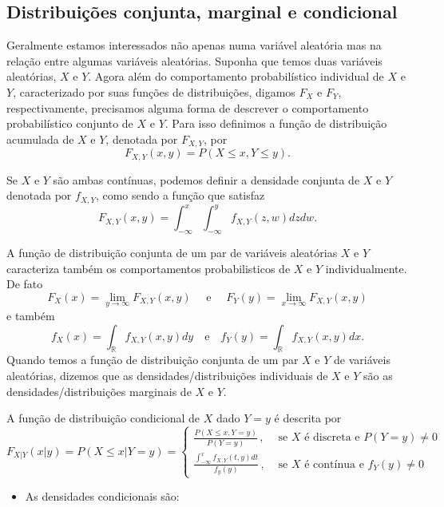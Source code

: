 \documentclass[
]{book}
\providecommand{\tightlist}{%
  \setlength{\itemsep}{0pt}\setlength{\parskip}{0pt}}
\theoremstyle{definition}
\theoremstyle{definition}
\theoremstyle{definition}
\theoremstyle{remark}
\begin{document}
\hypertarget{distribuiuxe7uxf5es-conjunta-marginal-e-condicional}{%
\subsection{Distribuições conjunta, marginal e condicional}\label{distribuiuxe7uxf5es-conjunta-marginal-e-condicional}}

Geralmente estamos interessados não apenas numa variável aleatória mas na relação entre algumas variáveis aleatórias. Suponha que temos duas variáveis aleatórias, \(X\) e \(Y\). Agora além do comportamento probabilístico individual de \(X\) e \(Y\), caracterizado por suas funções de distribuições, digamos \(F_X\) e \(F_Y\), respectivamente, precisamos alguma forma de descrever o comportamento probabilístico conjunto de \(X\) e \(Y\). Para isso definimos a função de distribuição acumulada de \(X\) e \(Y\), denotada por \(F_{X,Y}\), por \[F_{X,Y}(x,y)=P(X\leq x, Y\leq y).\]

Se \(X\) e \(Y\) são ambas contínuas, podemos definir a densidade conjunta de \(X\) e \(Y\) denotada por \(f_{X,Y}\), como sendo a função que satisfaz
\[F_{X,Y}(x,y)=\int_{-\infty}^x \int_{-\infty}^y f_{X,Y}(z,w)dzdw.\]

A função de distribuição conjunta de um par de variáveis aleatórias \(X\) e \(Y\) caracteriza também os comportamentos probabilisticos de \(X\) e \(Y\) individualmente. De fato
\[F_X(x)=\lim_{y\rightarrow\infty}F_{X,Y}(x,y) \quad \mbox{ e }\quad F_Y(y)=\lim_{x\rightarrow\infty}F_{X,Y}(x,y)\]
e também
\begin{equation*}
f_X(x)=\int_{\mathbb{R}}f_{X,Y}(x,y)dy\quad\mbox{e}\quad f_Y(y)=\int_{\mathbb{R}}f_{X,Y}(x,y)dx.
\end{equation*}
Quando temos a função de distribuição conjunta de um par \(X\) e \(Y\) de variáveis aleatórias, dizemos que as densidades/distribuições individuais de \(X\) e \(Y\) são as densidades/distribuições marginais de \(X\) e \(Y\).

A função de distribuição condicional de \(X\) dado \(Y=y\) é descrita por
\[F_{X|Y}(x|y)=P(X\leq x|Y=y)
=\left\{\begin{array}{cc} \frac{P(X\leq x,Y=y)}{P(Y=y)}\,, & \mbox{ se $X$ é discreta e }P(Y=y)\neq 0 \,\,\, \\
\frac{\int_{-\infty}^x f_{X,Y}(t,y)dt}{f_y(y)}\,, & \mbox{ se $X$ é contínua e } f_Y(y)\neq 0\end{array}\right.
\]

\begin{itemize}
\tightlist
\item
  As densidades condicionais são:
\end{itemize}
\end{document}
